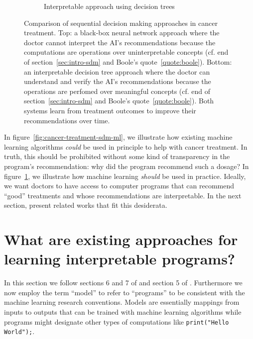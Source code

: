 \begin{figure}
\begin{subfigure}[b]{0.7\textwidth}
\begin{tikzpicture}
        \end{tikzpicture}
        \caption{Interpretable approach using decision trees}
        \label{fig:cancer-treatment-comparison}
    \end{subfigure}
    \caption{Comparison of sequential decision making approaches in cancer treatment. Top: a black-box neural network approach where the doctor cannot interpret the AI's recommendations because the computations are operations over uninterpretable concepts (cf. end of section~\ref{sec:intro-sdm} and Boole's quote~\ref{quote:boole}). Bottom: an interpretable decision tree approach where the doctor can understand and verify the AI's recommendations because the operations are perfomed over meaningful concepts  (cf. end of section~\ref{sec:intro-sdm} and Boole's quote~\ref{quote:boole}). Both systems learn from treatment outcomes to improve their recommendations over time.}
    \label{fig:cancer-treatment-comparison-combined}
\end{figure}

In figure~\ref{fig:cancer-treatment-sdm-ml}, we illustrate how existing machine learning algorithms \textit{could} be used in principle to help with cancer treatment. In truth, this should be prohibited without some kind of transparency in the program's recommendation: why did the program recommend such a dosage?
In figure~\ref{fig:cancer-treatment-comparison}, we illustrate how machine learning \textit{should} be used in practice. 
Ideally, we want doctors to have access to computer programs that can recommend ``good'' treatments and whose recommendations are interpretable. 
In the next section, present related works that fit this desiderata.

\section{What are existing approaches for learning interpretable programs?}\label{sec:intro-interp}

In this section we follow sections 6 and 7 of \cite{glanois-survey} and section 5 of \cite{milani-survey}. 
Furthermore we now employ the term ``model'' to refer to ``programs'' to be consistent with the machine learning research conventions.
Models are essentially mappings from inputs to outputs that can be trained with machine learning algorithms while programs might designate other types of computations like \texttt{print("Hello World");}.

